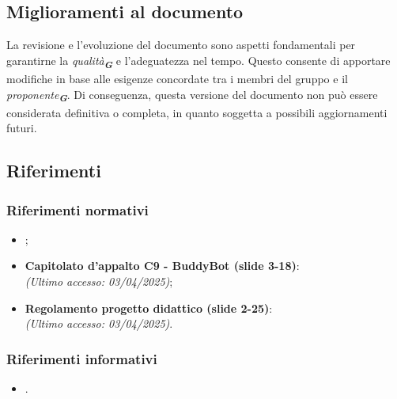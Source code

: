 \subsection{Miglioramenti al documento}
La revisione e l’evoluzione del documento sono aspetti fondamentali per garantirne la \emph{qualità}\textsubscript{\textbf{\textit{G}}}
e l’adeguatezza nel tempo.
Questo consente di apportare modifiche in base alle esigenze concordate tra i membri del gruppo e il
\emph{proponente}\textsubscript{\textbf{\textit{G}}}.
Di conseguenza, questa versione del documento non può essere considerata definitiva o completa, in quanto soggetta a possibili
aggiornamenti futuri.

\subsection{Riferimenti}
\label{sec:riferimenti}

\subsubsection{Riferimenti normativi}
\begin{itemize}
    \item {}; \\
    \item \textbf{Capitolato d'appalto C9 - BuddyBot (slide 3-18)}: \\
    \emph{(Ultimo accesso: 03/04/2025)};\\
    \item \textbf{Regolamento progetto didattico (slide 2-25)}:\\
    \emph{(Ultimo accesso: 03/04/2025)}.\\
\end{itemize}

\subsubsection{Riferimenti informativi}
\begin{itemize}
    \item {}. \\
\end{itemize}
